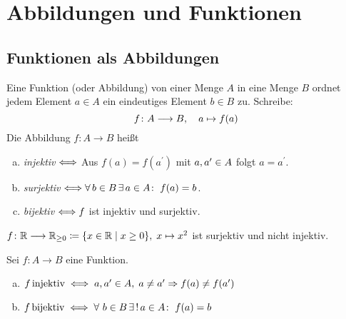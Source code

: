 \documentclass[../ana1.tex]{subfiles}
\begin{document}
\setcounter{section}{3}

\section{Abbildungen und Funktionen}

\subsection{Funktionen als Abbildungen}

\begin{defi}
	Eine Funktion (oder Abbildung) von einer Menge \(A \) in eine Menge \(B \) ordnet jedem Element \(a \in A \)
	ein eindeutiges Element \(b \in B \) zu. Schreibe:
	\[f \colon A \longrightarrow B , \quad a \mapsto f(a) \]
	Die Abbildung \(f \colon A \longrightarrow B \) heißt
	\begin{enumerate}[(a)]
		\item \textit{injektiv} \(\mathrel{\Longleftrightarrow} \) Aus \(f(a) = f(a^\prime) \) mit \(a , a^\prime \in A \) folgt \(a = a^\prime \).
		\item \textit{surjektiv} \(\longeq \forall b \in B \, \exists a \in A \colon \; f(a) = b \).
		\item \textit{bijektiv} \(\mathrel{\Longleftrightarrow} f \) ist injektiv und surjektiv. 
	\end{enumerate}
\end{defi}

\begin{bsp}
	\(f \colon \mathbb{R} \longrightarrow \mathbb{R}_{\geq 0} \coloneqq \{x \in \mathbb{R} \; \vert \; x \geq 0\} , \; x \mapsto x^{2} \) ist surjektiv und nicht injektiv.
\end{bsp}

\begin{bem}
	Sei \(f \colon A \longrightarrow B \) eine Funktion.
	\begin{enumerate}[(a)]
		\item \(f \operatorname{injektiv} \iff a , a^\prime \in A , \; a \neq a^\prime \Rightarrow f(a) \neq f(a^\prime) \)
		\item \(f \bijektiv \iff \forall \, b \in B \, \existse \,a \in A \colon \; f(a) = b \)
	\end{enumerate}
\end{bem}
\end{document}
